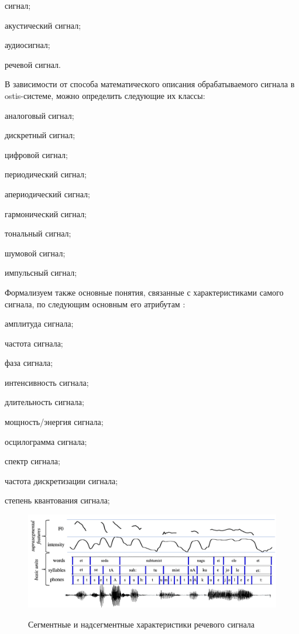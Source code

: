 \begin{textitemize}    
    \item сигнал;
    \item акустический сигнал;
    \item аудиосигнал;
    \item речевой сигнал.
\end{textitemize}

В зависимости от способа математического описания обрабатываемого сигнала в ostis-системе, можно определить следующие их классы:

\begin{textitemize}    
    \item аналоговый сигнал;
    \item дискретный сигнал;
    \item цифровой сигнал;
    \item периодический сигнал;
    \item апериодический сигнал;
    \item гармонический сигнал;
    \item тональный сигнал;
    \item шумовой сигнал;
    \item импульсный сигнал;
\end{textitemize}

Формализуем также основные понятия, связанные с характеристиками самого сигнала, по следующим основным его атрибутам \textit{}:
\begin{textitemize}  
    \item амплитуда сигнала;
    \item частота сигнала;
    \item фаза сигнала;
    \item интенсивность сигнала;
    \item длительность сигнала;
    \item мощность/энергия сигнала;
    \item осцилограмма сигнала;
    \item спектр сигнала;
    \item частота дискретизации сигнала;
    \item степень квантования сигнала;
\end{textitemize}

\begin{figure}[H]
    \caption{Сегментные и надсегментные характеристики речевого сигнала \cite{Okko2022}}
        \includegraphics[scale=0.8, width=1.0\textwidth]{author/part4/figures/ch43_fig02_speech-structure-segment-suprasegment.png}
    \label{fig:speech-structure-segment-suprasegment}
\end{figure}

